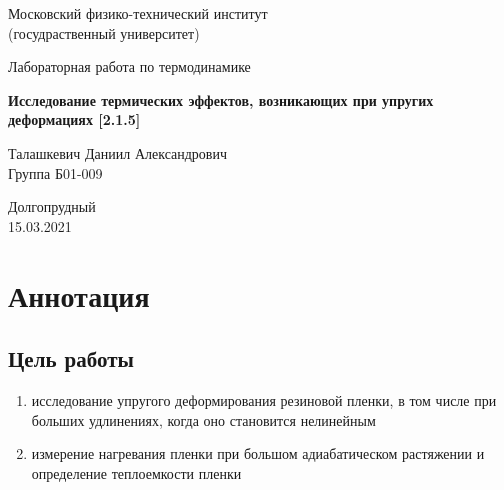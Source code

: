 \documentclass[a4paper,11.5pt]{article} %
\begin{document}


\begin{titlepage}

	\newpage
	\begin{center}
		\normalsize Московский физико-технический институт \\(госудраственный 			университет)
	\end{center}

	\vspace{6em}

	\begin{center}
		\Large Лабораторная работа по термодинамике\\
	\end{center}

	\vspace{1em}

	\begin{center}
		\large \textbf{Исследование термических эффектов,
возникающих при упругих деформациях [2.1.5]}
	\end{center}

	\vspace{2em}

	\begin{center}
		\large Талашкевич Даниил Александрович\\
		Группа Б01-009
	\end{center}

	\vspace{\fill}

	\begin{center}
	Долгопрудный \\15.03.2021
	\end{center}
	
\end{titlepage}



	\thispagestyle{empty}
	\newpage
	\tableofcontents
	\newpage
	\setcounter{page}{1}



\section{Аннотация}


\subsection{Цель работы}
\begin{enumerate}
    \item исследование упругого деформирования резиновой пленки, в том числе при больших удлинениях, когда оно становится нелинейным
    \item измерение нагревания пленки при большом адиабатическом растяжении и определение теплоемкости пленки
\end{enumerate}
\end{document}
